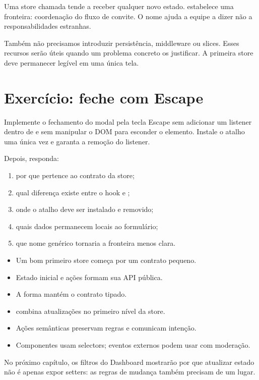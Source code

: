 Uma store chamada  tende a receber qualquer novo estado.
 estabelece uma fronteira: coordenação do fluxo de
convite. O nome ajuda a equipe a dizer não a responsabilidades estranhas.

Também não precisamos introduzir persistência, middleware ou slices. Esses
recursos serão úteis quando um problema concreto os justificar. A primeira store
deve permanecer legível em uma única tela.

\section{Exercício: feche com Escape}

\begin{tarefa}
Implemente o fechamento do modal pela tecla Escape sem adicionar um listener
dentro de  e sem manipular o DOM para esconder o elemento.
Instale o atalho uma única vez e garanta a remoção do listener.
\end{tarefa}

Depois, responda:

\begin{enumerate}
  \item por que  pertence ao contrato da store;
  \item qual diferença existe entre o hook e ;
  \item onde o atalho deve ser instalado e removido;
  \item quais dados permanecem locais ao formulário;
  \item que nome genérico tornaria a fronteira menos clara.
\end{enumerate}


\begin{resumo}
\begin{itemize}
  \item Um bom primeiro store começa por um contrato pequeno.
  \item Estado inicial e ações formam sua API pública.
  \item A forma  mantém o contrato tipado.
  \item {} combina atualizações no primeiro nível da store.
  \item Ações semânticas preservam regras e comunicam intenção.
  \item Componentes usam selectors; eventos externos podem usar
     com moderação.
\end{itemize}
\end{resumo}

No próximo capítulo, os filtros do Dashboard mostrarão por que atualizar estado
não é apenas expor setters: as regras de mudança também precisam de um lugar.
